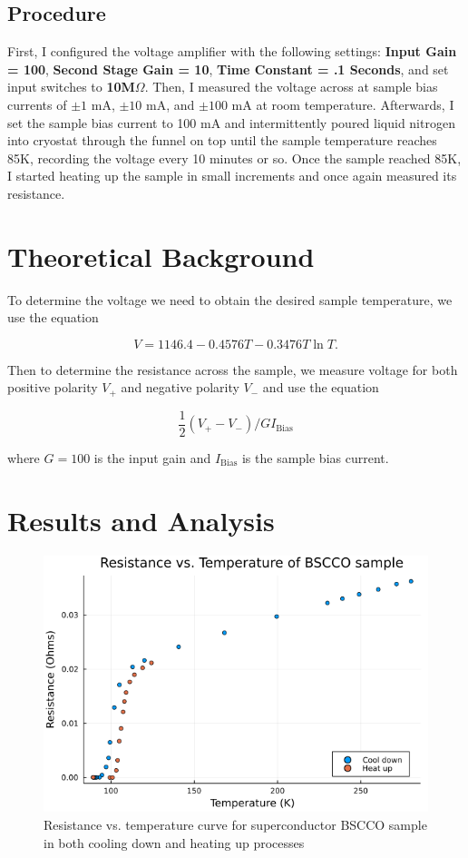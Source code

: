 \documentclass[12pt]{article}
\begin{document}
\subsection*{Procedure}
\label{sec:orgf6f23ad}

First, I configured the voltage amplifier with the following settings: \textbf{Input Gain = 100}, \textbf{Second Stage Gain = 10}, \textbf{Time Constant = .1 Seconds}, and set input switches to \textbf{10M\(\Omega\)}.
Then, I measured the voltage across at sample bias currents of \(\pm 1 \text{ mA}\), \(\pm 10 \text{ mA}\), and \(\pm 100 \text{ mA}\) at room temperature.
Afterwards, I set the sample bias current to 100 mA and intermittently poured liquid nitrogen into cryostat through the funnel on top until the sample temperature reaches 85K, recording the voltage every 10 minutes or so.
Once the sample reached 85K, I started heating up the sample in small increments and once again measured its resistance.

\section*{Theoretical Background}
\label{sec:org02f850d}

To determine the voltage we need to obtain the desired sample temperature, we use the equation

\[V = 1146.4 - 0.4576T - 0.3476 T \ln{T}. \tag{1}\]

Then to determine the resistance across the sample, we measure voltage for both positive polarity \(V_+\) and negative polarity \(V_-\) and use the equation

\[\frac{1}{2} (V_+ - V_-) / GI_{\text{Bias}} \tag{2}\]

where \(G = 100\) is the input gain and \(I_{\text{Bias}}\) is the sample bias current.

\section*{Results and Analysis}
\label{sec:org61db0f2}

\begin{figure}[htbp]
\centering
\includegraphics[width=.9\linewidth]{./resistancetemperature.png}
\caption{Resistance vs. temperature curve for superconductor BSCCO sample in both cooling down and heating up processes}
\end{figure}
\end{document}
